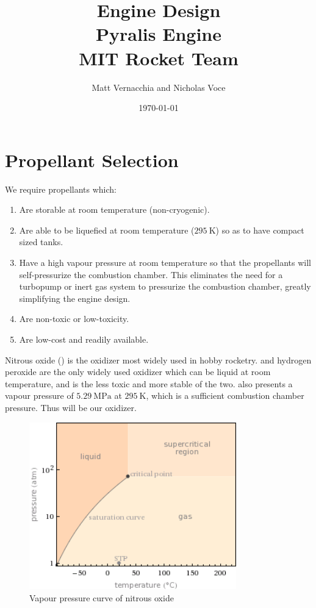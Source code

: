 \documentclass{article}
\title{Engine Design \\ Pyralis Engine \\ MIT Rocket Team} %
\author{Matt Vernacchia and Nicholas Voce} %
\date{ \today } %
\begin{document}
\maketitle
\section{Propellant Selection}
We require propellants which:
\begin{enumerate}
\item Are storable at room temperature (non-cryogenic).
\item Are able to be liquefied at room temperature ($\SI{295}{\kelvin}$) so as to have compact sized tanks.
\item Have a high vapour pressure at room temperature so that the propellants will self-pressurize the combustion chamber. This eliminates the need for a turbopump or inert gas system to pressurize the combustion chamber, greatly simplifying the engine design.
\item Are non-toxic or low-toxicity.
\item Are low-cost and readily available.
\end{enumerate}
Nitrous oxide () is the oxidizer most widely used in hobby rocketry.  and hydrogen peroxide are the only widely used oxidizer which can be liquid at room temperature, and  is the less toxic and more stable of the two.  also presents a vapour pressure of $\SI{5.29}{\mega\pascal}$ at $\SI{295}{\kelvin}$, which is a sufficient combustion chamber pressure. Thus  will be our oxidizer.\\
\begin{figure}[h!]
\centering
\includegraphics[width = 0.8\textwidth]{n2o_vap.png}
\caption{Vapour pressure curve of nitrous oxide} 
\label{n2o_vap}
\end{figure}
\end{document}

